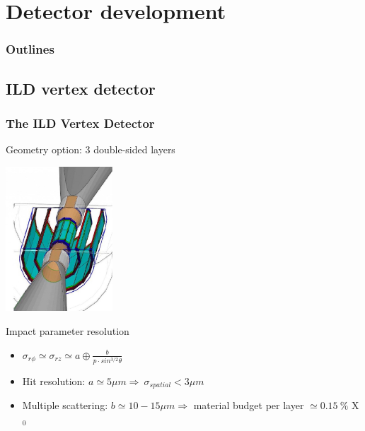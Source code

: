 \documentclass{beamer}
\begin{document}
\section{Detector development}
\begin{frame}
    \frametitle{Outlines}
    \tableofcontents[currentsection,hideothersubsections, 
    sectionstyle=show/shaded,]
\end{frame}

  \subsection{ILD vertex detector}
  \begin{frame}[label=vxd]
    \frametitle{The ILD Vertex Detector}

    \vspace{-0.3cm}
    \begin{block}{Geometry option: 3 double-sided layers}
      \begin{center}
        \includegraphics[width = 0.3\textwidth]{Pictures/ild_vxd_3layers.jpg}
      \end{center}
         
    \end{block}

    \vspace{-0.2cm}
    \begin{alertblock}{Impact parameter resolution}
      \begin{itemize}
        \item $\sigma_{r\phi} \simeq \sigma_{rz} \simeq a \oplus \frac{b}{p \cdot sin^{3/2} \theta}$
        \item Hit resolution: $a \simeq 5 \mu m \Rightarrow ~ \sigma_{spatial} < 3 \mu m$
        \item Multiple scattering: $b \simeq 10 - 15 \mu m \Rightarrow$ material budget per layer $\simeq 0.15~\%$ X$_0$ 
      \end{itemize}
    \end{alertblock}
\end{frame}
\end{document}
